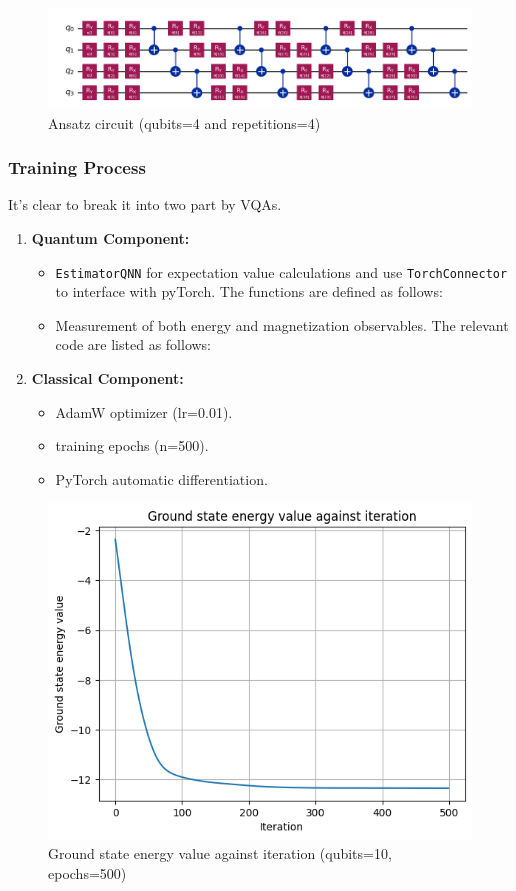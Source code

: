 \documentclass[pre,twocolumn,floatfix]{revtex4-1}
\begin{document}
\begin{figure}[htbp]
    \centering
    \includegraphics[width=0.5\linewidth]{images/ansatz.png}
    \caption{Ansatz circuit (qubits=4 and repetitions=4)}
    \label{4}
\end{figure}

\subsubsection{Training Process}
It's clear to break it into two part by VQAs.
\begin{enumerate}
    \item \textbf{Quantum Component:}
    \begin{itemize}
        \item \verb|EstimatorQNN| for expectation value calculations and use \verb|TorchConnector| to interface with pyTorch. 
        The functions are defined as follows:
        
    \item Measurement of both energy and magnetization observables.
    The relevant code are listed as follows:
    
    \end{itemize}
    \item \textbf{Classical Component:}
    \begin{itemize}
        \item AdamW optimizer (lr=0.01).
        \item training epochs (n=500).
        \item PyTorch automatic differentiation.
    \end{itemize}
\end{enumerate}

\begin{figure}[H]
    \centering
    \includegraphics[width=0.5\linewidth]{images/iteration.png}
    \caption{Ground state energy value against iteration (qubits=10, epochs=500)}
    \label{5}
\end{figure}
\end{document}
